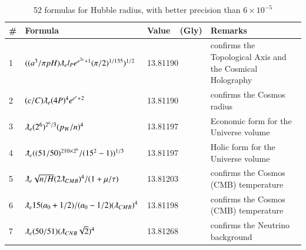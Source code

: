 \documentclass[a4paper,9pt]{article}
\begin{document}
\begin{appendix}
\begin{table}
\caption{52 formulas for Hubble radius, with better precision than $6 \times 10^{-5}$}
\label{tab:6:table6}
  \hskip-2.0cm\begin{tabular}{llll}
    \toprule
    \cmidrule(r){1-4}
   \#     & Formula     & Value~~(Gly) & Remarks \\
    \midrule    
    
     1 & $ ((a^3/\pi pH) \lambdabar_{e} l_P e^{e^{2e}+1} (\pi/2)^{1/135})^{1/2} $ & 13.81190 & confirms the Topological Axis and the Cosmical Holography  \\  
    2 & $ (c/C) \lambdabar_{e} (4P)^4 e^{e^{e}+2}  $ & 13.81190 & confirms the Cosmos radius  \\
    3 & $ \lambdabar_{e} (2^6)^{2^6/3} (p_W/n)^4  $ & 13.81197 & Economic form for the Universe volume \\    
    4 & $ \lambdabar_{e} ((51/50)^{210\times 2^6}/(15^2-1))^{1/3}  $ & 13.81197 & Holic form for the Universe volume \\    
    5 & $ \lambdabar_{e} \sqrt{n/H} (2\lambdabar_{CMB})^4 / (1+\mu/\tau) $ & 13.81203 & confirms the Cosmos (CMB) temperature \\   
    6 & $ \lambdabar_{e} 15(a_0+1/2)/(a_0-1/2) (\lambdabar_{CMB})^4  $ & 13.81198 & confirms the Cosmos (CMB) temperature \\    
    7 & $ \lambdabar_{e} (50/51) (\lambdabar_{CNB} \sqrt2)^4  $ & 13.81268 & confirms the Neutrino background \\   
    

\end{tabular}
\end{table}
\end{appendix}
\end{document}
